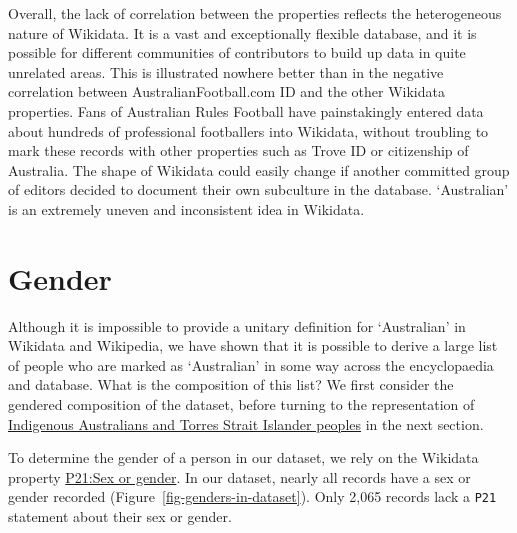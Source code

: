 \documentclass[
  a4paper,
  DIV=11,
  numbers=noendperiod]{scrreprt}
\begin{document}
Overall, the lack of correlation between the properties reflects the
heterogeneous nature of Wikidata. It is a vast and exceptionally
flexible database, and it is possible for different communities of
contributors to build up data in quite unrelated areas. This is
illustrated nowhere better than in the negative correlation between
AustralianFootball.com ID and the other Wikidata properties. Fans of
Australian Rules Football have painstakingly entered data about hundreds
of professional footballers into Wikidata, without troubling to mark
these records with other properties such as Trove ID or citizenship of
Australia. The shape of Wikidata could easily change if another
committed group of editors decided to document their own subculture in
the database. `Australian' is an extremely uneven and inconsistent idea
in Wikidata.

\hypertarget{gender}{%
\section{Gender}\label{gender}}

Although it is impossible to provide a unitary definition for
`Australian' in Wikidata and Wikipedia, we have shown that it is
possible to derive a large list of people who are marked as `Australian'
in some way across the encyclopaedia and database. What is the
composition of this list? We first consider the gendered composition of
the dataset, before turning to the representation of
\protect\hyperlink{indigeneity}{Indigenous Australians and Torres Strait
Islander peoples} in the next section.

To determine the gender of a person in our dataset, we rely on the
Wikidata property
\href{https://www.wikidata.org/wiki/Property:P21}{P21:Sex or gender}. In
our dataset, nearly all records have a sex or gender recorded
(Figure~\ref{fig-genders-in-dataset}). Only 2,065 records lack a
\texttt{P21} statement about their sex or gender.
\end{document}
